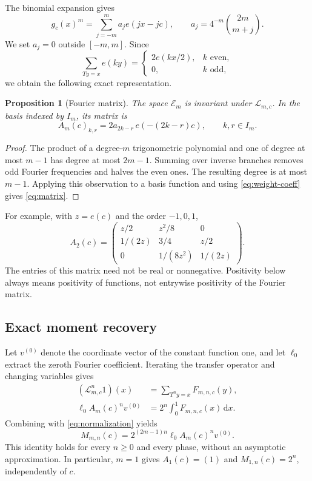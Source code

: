 \documentclass[11pt,a4paper]{article}
\numberwithin{equation}{section}
\newtheorem{proposition}[proposition]{Proposition}
\theoremstyle{definition}
\theoremstyle{remark}
\newcommand{\dd}{\,\mathrm d}
\newcommand{\Lop}{\mathcal L}
\begin{document}
The binomial expansion gives
\begin{equation}
 g_c(x)^m=\sum_{j=-m}^m a_j e(jx-jc),\qquad
 a_j=4^{-m}\binom{2m}{m+j}.
 \label{eq:weight-coeff}
\end{equation}
We set $a_j=0$ outside $[-m,m]$. Since
\[
 \sum_{Ty=x}e(ky)=
 \begin{cases}2e(kx/2),&k\text{ even},\\0,&k\text{ odd},\end{cases}
\]
we obtain the following exact representation.

\begin{proposition}[Fourier matrix]
\label{prop:matrix}
The space $\mathcal E_m$ is invariant under $\Lop_{m,c}$. In the basis
indexed by $I_m$, its matrix is
\begin{equation}
 \boxed{\quad
 A_m(c)_{k,r}=2a_{2k-r}\,e(-(2k-r)c),\qquad k,r\in I_m.
 \quad}
 \label{eq:matrix}
\end{equation}
\end{proposition}
\begin{proof}
The product of a degree-$m$ trigonometric polynomial and one of degree at
most $m-1$ has degree at most $2m-1$. Summing over inverse branches
removes odd Fourier frequencies and halves the even ones. The resulting
degree is at most $m-1$. Applying this observation to a basis function
and using \cref{eq:weight-coeff} gives \cref{eq:matrix}.
\end{proof}

For example, with $z=e(c)$ and the order $-1,0,1$,
\begin{equation}
 A_2(c)=
 \begin{pmatrix}
 z/2&z^2/8&0\\
 1/(2z)&3/4&z/2\\
 0&1/(8z^2)&1/(2z)
 \end{pmatrix}.
 \label{eq:A2}
\end{equation}
The entries of this matrix need not be real or nonnegative. Positivity
below always means positivity of functions, not entrywise positivity of
the Fourier matrix.

\subsection{Exact moment recovery}
Let $v^{(0)}$ denote the coordinate vector of the constant function one,
and let $\ell_0$ extract the zeroth Fourier coefficient. Iterating the
transfer operator and changing variables gives
\begin{align}
 (\Lop_{m,c}^n1)(x)&=\sum_{T^ny=x}F_{m,n,c}(y),\\
 \ell_0 A_m(c)^n v^{(0)}
 &=2^n\int_0^1F_{m,n,c}(x)\dd x.
 \label{eq:integral-transfer}
\end{align}
Combining with \cref{eq:normalization} yields
\begin{equation}
 \boxed{\quad
 M_{m,n}(c)=2^{(2m-1)n}\ell_0 A_m(c)^n v^{(0)}.
 \quad}
 \label{eq:exact-moment}
\end{equation}
This identity holds for every $n\geq0$ and every phase, without an
asymptotic approximation. In particular, $m=1$ gives $A_1(c)=(1)$ and
$M_{1,n}(c)=2^n$, independently of $c$.
\end{document}
